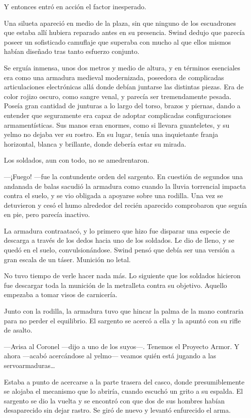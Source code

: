 Y entonces entró en acción el factor inesperado.

Una silueta apareció en medio de la plaza, sin que ninguno de los escuadrones que estaba allí hubiera reparado antes en su presencia. Swind dedujo que parecía poseer un sofisticado camuflaje que superaba con mucho al que ellos mismos habían diseñado tras tanto esfuerzo conjunto.

Se erguía inmensa, unos dos metros y medio de altura, y en términos esenciales era como una armadura medieval modernizada, poseedora de complicadas articulaciones electrónicas allá donde debían juntarse las distintas piezas. Era de color rojizo oscuro, como sangre venal, y parecía ser tremendamente pesada. Poseía gran cantidad de junturas a lo largo del torso, brazos y piernas, dando a entender que seguramente era capaz de adoptar complicadas configuraciones armamentísticas. Sus manos eran enormes, como si llevara guanteletes, y su yelmo no dejaba ver su rostro. En su lugar, tenía una inquietante franja horizontal, blanca y brillante, donde debería estar su mirada.

Los soldados, aun con todo, no se amedrentaron.

---¡Fuego! ---fue la contundente orden del sargento. En cuestión de segundos una andanada de balas sacudió la armadura como cuando la lluvia torrencial impacta contra el suelo, y se vio obligada a apoyarse sobre una rodilla. Una vez se detuvieron y cesó el humo alrededor del recién aparecido comprobaron que seguía en pie, pero parecía inactivo.

La armadura contraatacó, y lo primero que hizo fue disparar una especie de descarga a través de los dedos hacia uno de los soldados. Le dio de lleno, y se quedó en el suelo, convulsionándose. Swind pensó que debía ser una versión a gran escala de un táser. Munición no letal.

No tuvo tiempo de verle hacer nada más. Lo siguiente que los soldados hicieron fue descargar toda la munición de la metralleta contra su objetivo. Aquello empezaba a tomar visos de carnicería.

Junto con la rodilla, la armadura tuvo que hincar la palma de la mano contraria para no perder el equilibrio. El sargento se acercó a ella y la apuntó con su rifle de asalto.

---Avisa al Coronel ---dijo a uno de los suyos---. Tenemos el Proyecto Armor. Y ahora ---acabó acercándose al yelmo--- veamos quién está jugando a las servoarmaduras\dots

Estaba a punto de acercarse a la parte trasera del casco, donde presumiblemente se alojaba el mecanismo que lo abriría, cuando escuchó un grito a su espalda. El sargento se dio la vuelta y se encontró con que dos de sus hombres habían desaparecido sin dejar rastro. Se giró de nuevo y levantó enfurecido el arma.

